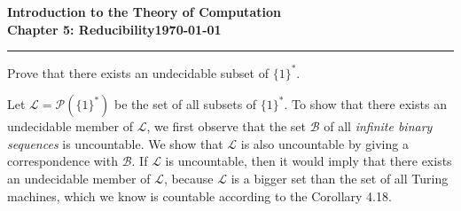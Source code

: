 \documentclass[11pt]{article}
\newcommand{\dated}{\today}
\begin{document}
\textbf{Introduction to the Theory of
Computation}\hfill\textbf{\myname}\\[0.01in]
\textbf{Chapter 5: Reducibility}\hfill\textbf{\dated}\\
\smallskip\hrule\bigskip

\begin{problem}{5.20}
Prove that there exists an undecidable subset of $\{1\}^{*}$.
\end{problem}

\begin{idea} Let $\mathcal{L} = \mathcal{P}(\{1\}^{*})$ be the set of all subsets of $\{1\}^{*}$. To show that there exists an undecidable member of $\mathcal{L}$, we first observe that the set $\mathcal{B}$ of all \textit{infinite binary sequences} is uncountable. We show that $\mathcal{L}$ is also uncountable by giving a correspondence with $\mathcal{B}$.
If $\mathcal{L}$ is uncountable, then it would imply that there exists an undecidable member of $\mathcal{L}$, because $\mathcal{L}$ is a bigger set than the set of all Turing machines, which we know is countable according to the Corollary 4.18.
\end{idea}
\end{document}
